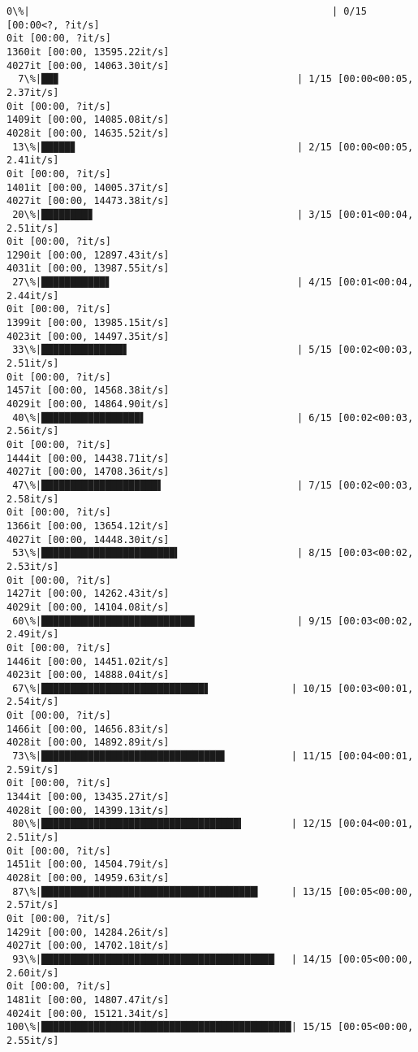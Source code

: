 \documentclass[11pt]{article}
\begin{document}
    \begin{Verbatim}[commandchars=\\\{\}]
  0\%|                                                    | 0/15 [00:00<?, ?it/s]
0it [00:00, ?it/s]
1360it [00:00, 13595.22it/s]
4027it [00:00, 14063.30it/s]
  7\%|██▉                                         | 1/15 [00:00<00:05,  2.37it/s]
0it [00:00, ?it/s]
1409it [00:00, 14085.08it/s]
4028it [00:00, 14635.52it/s]
 13\%|█████▊                                      | 2/15 [00:00<00:05,  2.41it/s]
0it [00:00, ?it/s]
1401it [00:00, 14005.37it/s]
4027it [00:00, 14473.38it/s]
 20\%|████████▊                                   | 3/15 [00:01<00:04,  2.51it/s]
0it [00:00, ?it/s]
1290it [00:00, 12897.43it/s]
4031it [00:00, 13987.55it/s]
 27\%|███████████▋                                | 4/15 [00:01<00:04,  2.44it/s]
0it [00:00, ?it/s]
1399it [00:00, 13985.15it/s]
4023it [00:00, 14497.35it/s]
 33\%|██████████████▋                             | 5/15 [00:02<00:03,  2.51it/s]
0it [00:00, ?it/s]
1457it [00:00, 14568.38it/s]
4029it [00:00, 14864.90it/s]
 40\%|█████████████████▌                          | 6/15 [00:02<00:03,  2.56it/s]
0it [00:00, ?it/s]
1444it [00:00, 14438.71it/s]
4027it [00:00, 14708.36it/s]
 47\%|████████████████████▌                       | 7/15 [00:02<00:03,  2.58it/s]
0it [00:00, ?it/s]
1366it [00:00, 13654.12it/s]
4027it [00:00, 14448.30it/s]
 53\%|███████████████████████▍                    | 8/15 [00:03<00:02,  2.53it/s]
0it [00:00, ?it/s]
1427it [00:00, 14262.43it/s]
4029it [00:00, 14104.08it/s]
 60\%|██████████████████████████▍                 | 9/15 [00:03<00:02,  2.49it/s]
0it [00:00, ?it/s]
1446it [00:00, 14451.02it/s]
4023it [00:00, 14888.04it/s]
 67\%|████████████████████████████▋              | 10/15 [00:03<00:01,  2.54it/s]
0it [00:00, ?it/s]
1466it [00:00, 14656.83it/s]
4028it [00:00, 14892.89it/s]
 73\%|███████████████████████████████▌           | 11/15 [00:04<00:01,  2.59it/s]
0it [00:00, ?it/s]
1344it [00:00, 13435.27it/s]
4028it [00:00, 14399.13it/s]
 80\%|██████████████████████████████████▍        | 12/15 [00:04<00:01,  2.51it/s]
0it [00:00, ?it/s]
1451it [00:00, 14504.79it/s]
4028it [00:00, 14959.63it/s]
 87\%|█████████████████████████████████████▎     | 13/15 [00:05<00:00,  2.57it/s]
0it [00:00, ?it/s]
1429it [00:00, 14284.26it/s]
4027it [00:00, 14702.18it/s]
 93\%|████████████████████████████████████████▏  | 14/15 [00:05<00:00,  2.60it/s]
0it [00:00, ?it/s]
1481it [00:00, 14807.47it/s]
4024it [00:00, 15121.34it/s]
100\%|███████████████████████████████████████████| 15/15 [00:05<00:00,  2.55it/s]
    \end{Verbatim}
\end{document}
